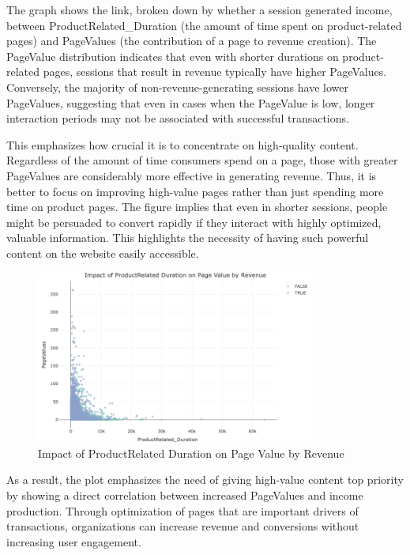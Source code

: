 \documentclass[12pt]{article}
\begin{document}
\FloatBarrier
The graph shows the link, broken down by whether a session generated income, between ProductRelated\_Duration (the amount of time spent on product-related pages) and PageValues (the contribution of a page to revenue creation). The PageValue distribution indicates that even with shorter durations on product-related pages, sessions that result in revenue typically have higher PageValues. Conversely, the majority of non-revenue-generating sessions have lower PageValues, suggesting that even in cases when the PageValue is low, longer interaction periods may not be associated with successful transactions.

This emphasizes how crucial it is to concentrate on high-quality content. Regardless of the amount of time consumers spend on a page, those with greater PageValues are considerably more effective in generating revenue. Thus, it is better to focus on improving high-value pages rather than just spending more time on product pages. The figure implies that even in shorter sessions, people might be persuaded to convert rapidly if they interact with highly optimized, valuable information. This highlights the necessity of having such powerful content on the website easily accessible.

\begin{figure}[h]
    \centering
    \includegraphics[width=0.82\textwidth]{Impact of ProductRelated Duration on Page Value by Revenue.png}  
    \caption{Impact of ProductRelated Duration on Page Value by Revenue}
\end{figure}
\vspace{0.5cm}

\FloatBarrier
As a result, the plot emphasizes the need of giving high-value content top priority by showing a direct correlation between increased PageValues and income production. Through optimization of pages that are important drivers of transactions, organizations can increase revenue and conversions without increasing user engagement.
\vspace{0.5cm}
\end{document}
